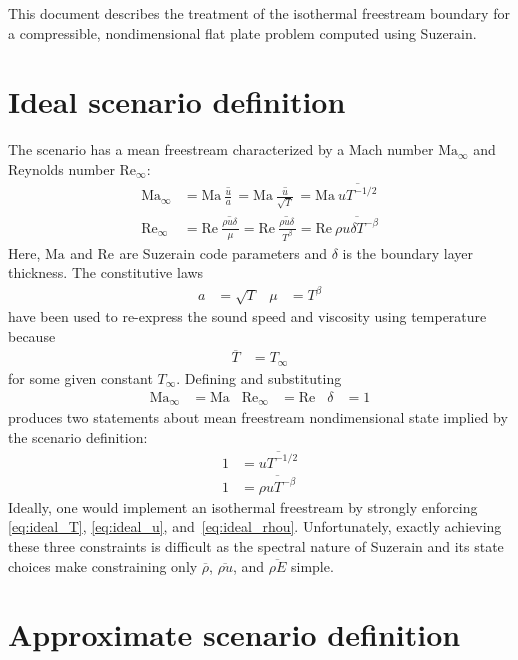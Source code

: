 \documentclass[letterpaper,11pt,nointlimits,reqno]{amsart}
\newcommand{\Mach}[1][]{\ensuremath{\mbox{Ma}_{#1}}}
\newcommand{\Reynolds}[1][]{\ensuremath{\mbox{Re}_{#1}}}
\begin{document}
This document describes the treatment of the isothermal freestream boundary for
a compressible, nondimensional flat plate problem computed using Suzerain.

\section{Ideal scenario definition}

The scenario has a mean freestream characterized by a Mach number
$\Mach[\infty]$ and Reynolds number $\Reynolds[\infty]$:
\begin{align}
  \Mach[\infty]{}
  &= \Mach{} \overline{\,\frac{u}{a}\,}
   = \Mach{} \overline{\,\frac{u}{\sqrt{T}}\,}
   = \Mach\, \overline{u T^{-1/2}}
\\
  \Reynolds[\infty]{}
  &= \Reynolds{} \overline{\,\frac{\rho u \delta\,} {\mu}}
   = \Reynolds{} \overline{\,\frac{\rho u \delta\,} {T^\beta}}
   = \Reynolds\, \overline{\rho u \delta T^{-\beta}}
\end{align}
Here, $\Mach$ and $\Reynolds$ are Suzerain code parameters and $\delta$ is the
boundary layer thickness.  The constitutive laws
\begin{align}
  a &= \sqrt{T}
&\mu &= {T}^\beta
\end{align}
have been used to re-express the sound speed and viscosity using temperature
because
\begin{align}
  \label{eq:ideal_T}
  \overline{T} &= T_\infty
\end{align}
for some given constant $T_\infty$.  Defining and substituting
\begin{align}
  \Mach[\infty]{} &= \Mach
& \Reynolds[\infty]{} &= \Reynolds
& \delta &= 1
\end{align}
produces two statements about mean freestream nondimensional state implied by
the scenario definition:
\begin{align}
  \label{eq:ideal_u}
  1 &= \overline{u T^{-1/2}}
\\
  \label{eq:ideal_rhou}
  1 &= \overline{\rho u T^{-\beta}}
\end{align}
Ideally, one would implement an isothermal freestream by strongly enforcing
\eqref{eq:ideal_T}, \eqref{eq:ideal_u}, and~\eqref{eq:ideal_rhou}.
Unfortunately, exactly achieving these three constraints is difficult as the
spectral nature of Suzerain and its state choices make constraining only
$\overline{\rho}$, $\overline{\rho{}u}$, and $\overline{\rho{}E}$ simple.

\section{Approximate scenario definition}
\end{document}
